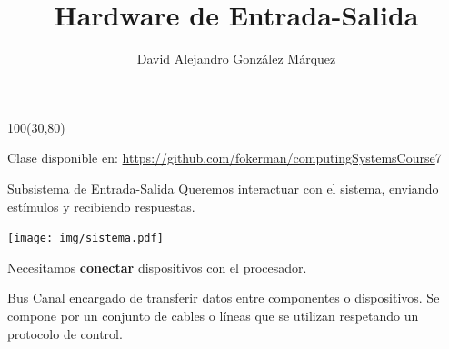 \documentclass[aspectratio=169]{beamer}
\title{\Huge Hardware de Entrada-Salida}
\author{David Alejandro González Márquez}
\date{}
\begin{document}
\begin{frame}[plain]
    \titlepage
    \begin{textblock}{100}(30,80)
    \begin{tcolorbox}[size=small,width=\textwidth,colback={gray!30},title={}]
    \begin{center}
     \scriptsize Clase disponible en: \url{https://github.com/fokerman/computingSystemsCourse}7
    \end{center}
    \end{tcolorbox}
    \end{textblock}
\end{frame}

\begin{frame}[fragile]{Subsistema de Entrada-Salida}
    Queremos interactuar con el sistema, enviando estímulos y recibiendo respuestas.
    \begin{center} \texttt{[image: img/sistema.pdf]} \end{center}
    \begin{center}
    \textcolor{verdeuca}{Necesitamos \textbf{conectar} dispositivos con el procesador.}
    \end{center}
    \pause
    \vspace{-0.3cm}
    \begin{block}{\Large Bus}
    Canal encargado de transferir datos entre componentes o dispositivos. 
    Se compone por un conjunto de cables o líneas que se utilizan respetando un protocolo de control.
    \end{block}
\end{frame}
\end{document}
